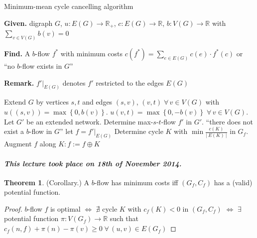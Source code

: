 \documentclass[a4paper]{article}
\theoremstyle{definition}
\newtheorem{theorem}{Theorem}
\newcommand{\card}[1]{\left|\:\!#1\:\!\right|}
\newcommand{\set}[1]{\left\{#1\right\}}
\newcommand{\given}[1]{\textbf{Given.} #1\par}
\newcommand{\find}[1]{\textbf{Find.} #1\par}
\newcommand{\dateref}[1]{\paragraph{\textit{This lecture took place on #1.}}}
\newcommand{\fall}{\;\forall\,}
\begin{document}
\begin{algorithm}
  \caption{Minimum-mean cycle cancelling algorithm}
  \label{minimum-mean-cancelling-algo}
  \given{digraph $G$, $u: E(G) \rightarrow \mathbb{R}_+$, $c: E(G) \rightarrow \mathbb{R}$, $b: V(G) \rightarrow \mathbb{R}$ with $\sum_{v \in V(G)} b(v) = 0$}
  \find{A $b$-flow $f^*$ with minimum costs $c(f^*) = \sum_{e \in E(G)} c(e) \cdot f^*(c)$ or ``no $b$-flow exists in $G$''}
  \textbf{Remark.} $f'|_{E(G)}$ denotes $f'$ restricted to the edges $E(G)$ \par
\begin{algorithmic}[1]
  \State Extend $G$ by vertices $s,t$ and edges $(s, v)$, $(v, t) \fall v \in V(G)$ with $u((s,v)) = \max\set{0,b(v)}$. $u(v, t) = \max\set{0, -b(v)} \fall v \in V(G)$. Let $G'$ be an extended network. Determine max-$s$-$t$-flow $f'$ in $G'$.
    \State ``there does not exist a $b$-flow in $G$''
  \Else
    \State let $f = f'|_{E(G)}$
  \EndIf
    \State Determine cycle $K$ with $\min\frac{c(K)}{\card{E(K)}}$ in $G_f$.
    \State Augment $f$ along $K: f := f \oplus K$
  \EndWhile
  \State {}
\end{algorithmic}
\end{algorithm}

\dateref{18th of November 2014}

\begin{theorem}
  (Corollary.)
  A $b$-flow has minimum costs iff $(G_f, C_f)$ has a (valid) potential function.
\end{theorem}
\begin{proof}
  $b$-flow $f$ is optimal $\Leftrightarrow$ $\nexists$ cycle $K$ with $c_f(K) < 0$ in $(G_f, C_f)$
  $\Leftrightarrow$ $\exists$ potential function $\pi: V(G_f) \rightarrow \mathbb{R}$ such that $c_f(n,f) + \pi(n) - \pi(v) \geq 0 \fall (u,v) \in E(G_f)$
\end{proof}
\end{document}
